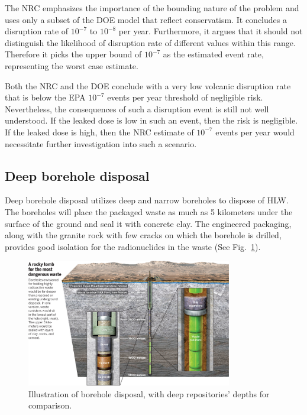 \documentclass[nofootinbib,preprint,aps]{revtex4-1}
\begin{document}
        The NRC emphasizes the importance of the bounding nature of the problem and uses only a subset
        of the DOE model that reflect conservatism. It concludes a disruption rate of
        $10^{-7}$ to $10^{-8}$ per year. Furthermore, it argues that it should not distinguish the likelihood
        of disruption rate of different values within this range. Therefore it picks the upper bound
        of $10^{-7}$ as the estimated event rate, representing the worst case estimate.

        Both the NRC and the DOE conclude with a very low volcanic disruption rate that is below the EPA
        $10^{-7}$ events per year threshold of negligible risk.
        Nevertheless, the consequences of such a disruption event is still not well understood.
        If the leaked dose is low in such an event, then the risk is negligible. If the leaked dose is high,
        then the NRC estimate of $10^{-7}$ events per year would necessitate further investigation into such
        a scenario.\cite{cv14}
        \subsection{Deep borehole disposal}
        Deep borehole disposal utilizes deep and narrow boreholes to dispose of HLW. The boreholes
        will place the packaged waste as much as 5 kilometers under the surface of the ground and seal it
        with concrete clay.
        The engineered packaging, along with the granite rock with few cracks on which the borehole is drilled,
        provides
        good isolation for the radionuclides in the waste (See Fig.~\ref{fig:borehole}).
        \begin{figure}[h]
            \centering
            \includegraphics[width=0.8\textwidth]{borehole.jpg}
            \caption{Illustration of borehole disposal, with deep repositories' depths for comparison.\cite{c15}}
            \label{fig:borehole}
        \end{figure}
\end{document}
